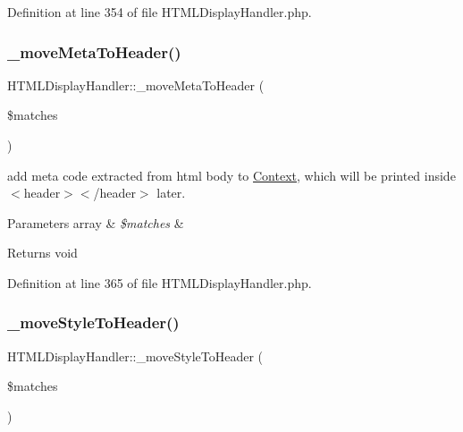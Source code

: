Definition at line 354 of file H\+T\+M\+L\+Display\+Handler.\+php.

\hypertarget{classHTMLDisplayHandler_a95922f4ce120e4cd0e08ed328282a003}{}\label{classHTMLDisplayHandler_a95922f4ce120e4cd0e08ed328282a003} 
\subsubsection{\texorpdfstring{\+\_\+move\+Meta\+To\+Header()}{\_moveMetaToHeader()}}
{\footnotesize\ttfamily H\+T\+M\+L\+Display\+Handler\+::\+\_\+move\+Meta\+To\+Header (\begin{DoxyParamCaption}\item[{}]{\$matches }\end{DoxyParamCaption})}

add meta code extracted from html body to \hyperlink{classContext}{Context}, which will be printed inside $<$header$>$$<$/header$>$ later. 
\begin{DoxyParams}[1]{Parameters}
array & {\em \$matches} & \\
\hline
\end{DoxyParams}
\begin{DoxyReturn}{Returns}
void 
\end{DoxyReturn}


Definition at line 365 of file H\+T\+M\+L\+Display\+Handler.\+php.

\hypertarget{classHTMLDisplayHandler_a68e7b6f173d231d71572509067a203f4}{}\label{classHTMLDisplayHandler_a68e7b6f173d231d71572509067a203f4} 
\subsubsection{\texorpdfstring{\+\_\+move\+Style\+To\+Header()}{\_moveStyleToHeader()}}
{\footnotesize\ttfamily H\+T\+M\+L\+Display\+Handler\+::\+\_\+move\+Style\+To\+Header (\begin{DoxyParamCaption}\item[{}]{\$matches }\end{DoxyParamCaption})}

